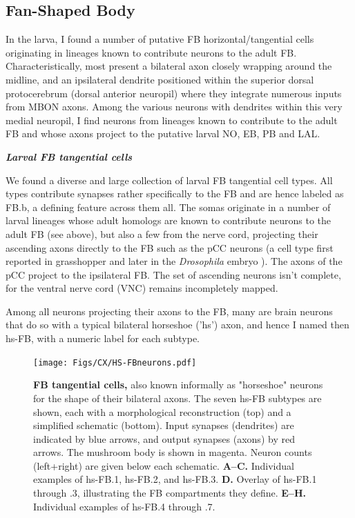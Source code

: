     \subsection{Fan-Shaped Body}

    In the larva, I found a number of putative FB horizontal/tangential cells
    originating in lineages known to contribute neurons to the adult FB. Characteristically, most present a bilateral axon closely wrapping around the midline, and an ipsilateral dendrite positioned within the superior dorsal protocerebrum (dorsal anterior neuropil) where they integrate numerous inputs from MBON axons. Among the various neurons with dendrites within this very medial neuropil, I find neurons from lineages known to contribute to the adult FB and whose axons project to the putative larval NO, EB, PB and LAL.


    \textbf{\textit{Larval FB tangential cells}}


    We found a diverse and large collection of larval FB tangential cell types.
    All types contribute synapses rather specifically to the FB and are hence labeled as FB.b, a defining feature across them all.
    The somas originate in a number of larval lineages whose adult homologs are known to contribute neurons to the adult FB (see above), but also a few from the nerve cord, projecting their ascending axons directly to the FB such as the pCC neurons (a cell type first reported in grasshopper \citep{goodman1984pCC} and later in the \textit{Drosophila} embryo \citep{jacobs1989pCC}). The axons of the pCC project to the ipsilateral FB. The set of ascending neurons isn't complete, for the ventral nerve cord (VNC) remains incompletely mapped.

    Among all neurons projecting their axons to the FB, many are brain neurons that do so with a typical bilateral horseshoe ('hs') axon, and hence I named then hs-FB, with a numeric label for each subtype.

        \begin{figure}
            \centering
            \texttt{[image: Figs/CX/HS-FBneurons.pdf]}
            \caption{\textbf{FB tangential cells,} also known informally as "horseshoe" neurons for the shape of their bilateral axons. The seven hs-FB subtypes are shown, each with a morphological reconstruction (top) and a simplified schematic (bottom). Input synapses (dendrites) are indicated by blue arrows, and output synapses (axons) by red arrows. The mushroom body is shown in magenta. Neuron counts (left+right) are given below each schematic. \textbf{A–C.} Individual examples of hs-FB.1, hs-FB.2, and hs-FB.3. \textbf{D.} Overlay of hs-FB.1 through .3, illustrating the FB compartments they define. \textbf{E–H.} Individual examples of hs-FB.4 through .7.}
        \label{fig:HSFBneurons}
        \end{figure}

